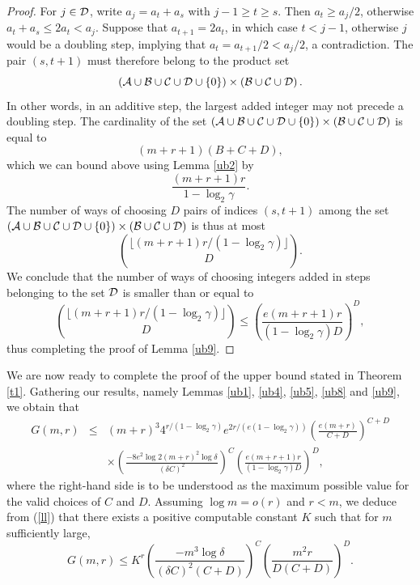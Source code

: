 \documentclass{article}
\theoremstyle{definition}
\begin{document}
\begin{proof}
For $j\in {\cal D}$, write $a_j=a_t+a_s$ with $j-1\ge t\ge s$.  Then $a_t\ge a_j/2$, otherwise $a_t+a_s\le 2a_t<a_j$. Suppose that $a_{t+1}=2a_t$, in which case $t<j-1$, otherwise $j$ would be a doubling step, implying that $a_t= a_{t+1}/2<a_j/2$, a contradiction.   The pair $(s,t+1)$ must therefore belong to the product set
$$
\left({\cal A}\cup {\cal B}\cup {\cal C}\cup {\cal D}\cup \{0\}\right) \times \left({\cal B}\cup {\cal C}\cup {\cal D}\right).
$$
In other words, in an additive step, the largest added integer may not precede a doubling step.
The cardinality of the set $\left({\cal A}\cup {\cal B}\cup {\cal C}\cup {\cal D}\cup \{0\}\right) \times \left({\cal B}\cup {\cal C}\cup {\cal D}\right)$ is equal to
$$
(m+r+1)(B+C+D),
$$
which we can bound above using Lemma \ref{ub2} by
$$
\frac{(m+r+1)r}{1-\log_2 \gamma}.
$$
The number of ways of choosing $D$ pairs of indices $(s,t+1)$ among the set \\ \hbox{$\left({\cal A}\cup {\cal B}\cup {\cal C}\cup {\cal D}\cup\{0\}\right) \times \left({\cal B}\cup {\cal C}\cup {\cal D}\right)$} is thus at most
$$
{\lfloor (m+r+1)r/(1-\log_2 \gamma)\rfloor\choose D}.
$$
We conclude that the number of ways of choosing integers added in steps belonging to the set ${\cal D}$ is smaller than or equal to
$$
 {\lfloor (m+r+1)r/(1-\log_2 \gamma )\rfloor \choose D}\le \left(\frac{e(m+r+1)r}{(1-\log_2 \gamma)D}\right)^D,
$$
thus completing the proof of Lemma \ref{ub9}.
\end{proof}

We are now ready to complete the proof of the upper bound stated in Theorem \ref{t1}.
Gathering our results, namely Lemmas \ref{ub1}, \ref{ub4}, \ref{ub5}, \ref{ub8} and \ref{ub9}, we obtain that
\begin{eqnarray}\label{ll}
G(m,r)&\le& (m+r)^3 4^{r/(1-\log_2 \gamma)}e^{2r/(e(1-\log_2 \gamma))}\left(\frac{e(m+r)}{C+D}\right)^{C+D}\nonumber\\
& &\times \left(\frac{-8e^2\log 2(m+r)^2\log \delta}{(\delta C)^2}\right)^{C}\left(\frac{e(m+r+1)r}{(1-\log_2\gamma)D}\right)^D,
\end{eqnarray}
where the right-hand side is to be understood as the maximum possible value for the valid choices of $C$ and $D$. Assuming $\log m=o(r)$ and $r<m$, we deduce from (\ref{ll}) that there exists a positive computable constant $K$ such that for $m$  sufficiently large,
\begin{equation}\label{filon4}
G(m,r)\le K^r\left(\frac{-m^3\log \delta}{(\delta C)^2(C+D)}\right)^{C}\left(\frac{m^2r}{D(C+D)}\right)^D.
\end{equation}
\end{document}

